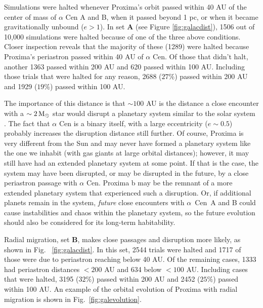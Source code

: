 \documentclass[preprint,12pt]{aastex}
\def\msun{{\rm\,M_\odot}}
\def\acen{{$\alpha$~Cen}}
\begin{document}
Simulations were halted whenever Proxima's orbit passed within 40 AU
of the center of mass of $\alpha$ Cen A and B, when it passed beyond 1
pc, or when it became gravitationally unbound ($e > 1$). In set
\textbf{A} (see Figure \ref{fig:galacdist}), 1506
out of 10,000 simulations were halted because of one of the three
above conditions.  Closer inspection reveals that the majority of
these (1289) were halted because Proxima's periastron passed within 40
AU of $\alpha$ Cen. Of those that didn't halt, another 1363 passed
within 200 AU and 620 passed within 100 AU. Including those trials
that were halted for any reason, 2688 ($27\%$) passed within 200 AU
and 1929 ($19\%$) passed within 100 AU.

The importance of this distance is that $\sim 100$ AU is the distance a close
encounter with a $\sim 2\msun$ star would disrupt a planetary system
similar to the solar system \citep{Kaib13}. The fact that $\alpha$ Cen
is a binary itself, with a large eccentricity ($e \sim 0.5$) probably
increases the disruption distance still further.  Of course, Proxima
is very different from the Sun and may never have formed a planetary
system like the one we inhabit (with gas giants at large orbital
distances); however, it may still have had an extended planetary
system at some point. If that is the case, the system may have been
disrupted, or may be disrupted in the future, by a close periastron
passage with $\alpha$ Cen. Proxima b may be the remnant of a more
extended planetary system that experienced such a disruption. Or, if 
additional planets remain in the system, \emph{future} close encounters
with \acen~A and B could cause instabilities and chaos within the 
planetary system, so the future evolution should also be considered
for its long-term habitability.

Radial migration, set \textbf{B}, makes close passages and disruption
more likely, as shown in Fig.~ \ref{fig:galacdist}. In this set, 2544
trials were halted and 1717 of those were due to periastron reaching
below 40 AU. Of the remaining cases, 1333 had periastron distances $<
200$ AU and 634 below $<100$ AU. Including cases that were halted,
3195 ($32\%$) passed within 200 AU and 2452 ($25\%$) passed within 100
AU.  An example of the orbital evolution of Proxima with radial
migration is shown in Fig.~\ref{fig:galevolution}.
\end{document}
